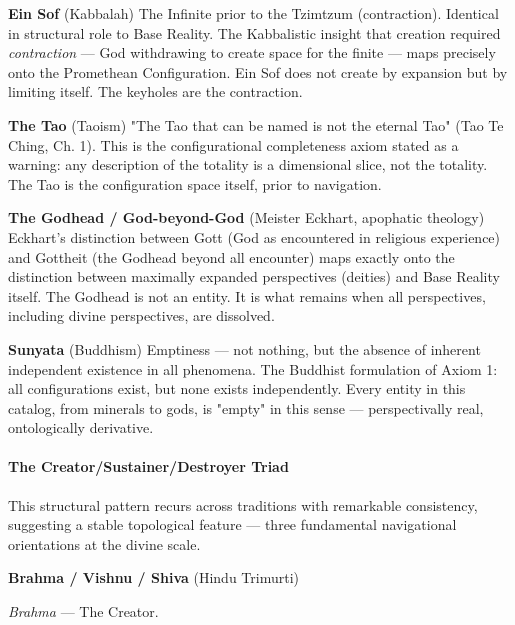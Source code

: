 \textbf{Ein Sof} (Kabbalah) The Infinite prior to the Tzimtzum (contraction). Identical in structural role to Base Reality. The Kabbalistic insight that creation required \textit{contraction} — God withdrawing to create space for the finite — maps precisely onto the Promethean Configuration. Ein Sof does not create by expansion but by limiting itself. The keyholes are the contraction.


\textbf{The Tao} (Taoism) "The Tao that can be named is not the eternal Tao" (Tao Te Ching, Ch. 1). This is the configurational completeness axiom stated as a warning: any description of the totality is a dimensional slice, not the totality. The Tao is the configuration space itself, prior to navigation.


\textbf{The Godhead / God-beyond-God} (Meister Eckhart, apophatic theology) Eckhart's distinction between Gott (God as encountered in religious experience) and Gottheit (the Godhead beyond all encounter) maps exactly onto the distinction between maximally expanded perspectives (deities) and Base Reality itself. The Godhead is not an entity. It is what remains when all perspectives, including divine perspectives, are dissolved.


\textbf{Sunyata} (Buddhism) Emptiness — not nothing, but the absence of inherent independent existence in all phenomena. The Buddhist formulation of Axiom 1: all configurations exist, but none exists independently. Every entity in this catalog, from minerals to gods, is "empty" in this sense — perspectivally real, ontologically derivative.


\paragraph*{The Creator/Sustainer/Destroyer Triad}


This structural pattern recurs across traditions with remarkable consistency, suggesting a stable topological feature — three fundamental navigational orientations at the divine scale.


\textbf{Brahma / Vishnu / Shiva} (Hindu Trimurti)


\textit{Brahma} — The Creator.

